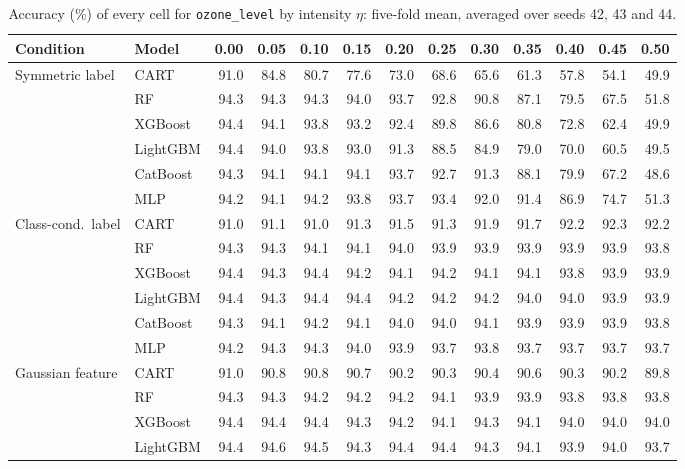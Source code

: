 \documentclass[pdflatex,sn-mathphys]{sn-jnl}
\theoremstyle{thmstyleone}
\begin{document}
\begin{table}[htbp]
\centering
\tiny
\setlength{\tabcolsep}{2.6pt}
\caption{Accuracy (\%) of every cell for \texttt{ozone\_level} by intensity $\eta$: five-fold mean, averaged over seeds 42, 43 and 44.}
\label{tab:grid_ozone_level}
\begin{tabular}{@{}llrrrrrrrrrrr@{}}
\toprule
Condition & Model & 0.00 & 0.05 & 0.10 & 0.15 & 0.20 & 0.25 & 0.30 & 0.35 & 0.40 & 0.45 & 0.50 \\
\midrule
Symmetric label & CART & 91.0 & 84.8 & 80.7 & 77.6 & 73.0 & 68.6 & 65.6 & 61.3 & 57.8 & 54.1 & 49.9 \\
 & RF & 94.3 & 94.3 & 94.3 & 94.0 & 93.7 & 92.8 & 90.8 & 87.1 & 79.5 & 67.5 & 51.8 \\
 & XGBoost & 94.4 & 94.1 & 93.8 & 93.2 & 92.4 & 89.8 & 86.6 & 80.8 & 72.8 & 62.4 & 49.9 \\
 & LightGBM & 94.4 & 94.0 & 93.8 & 93.0 & 91.3 & 88.5 & 84.9 & 79.0 & 70.0 & 60.5 & 49.5 \\
 & CatBoost & 94.3 & 94.1 & 94.1 & 94.1 & 93.7 & 92.7 & 91.3 & 88.1 & 79.9 & 67.2 & 48.6 \\
 & MLP & 94.2 & 94.1 & 94.2 & 93.8 & 93.7 & 93.4 & 92.0 & 91.4 & 86.9 & 74.7 & 51.3 \\
\midrule
Class-cond.\ label & CART & 91.0 & 91.1 & 91.0 & 91.3 & 91.5 & 91.3 & 91.9 & 91.7 & 92.2 & 92.3 & 92.2 \\
 & RF & 94.3 & 94.3 & 94.1 & 94.1 & 94.0 & 93.9 & 93.9 & 93.9 & 93.9 & 93.9 & 93.8 \\
 & XGBoost & 94.4 & 94.3 & 94.4 & 94.2 & 94.1 & 94.2 & 94.1 & 94.1 & 93.8 & 93.9 & 93.9 \\
 & LightGBM & 94.4 & 94.3 & 94.4 & 94.4 & 94.2 & 94.2 & 94.2 & 94.0 & 94.0 & 93.9 & 93.9 \\
 & CatBoost & 94.3 & 94.1 & 94.2 & 94.1 & 94.0 & 94.0 & 94.1 & 93.9 & 93.9 & 93.9 & 93.8 \\
 & MLP & 94.2 & 94.3 & 94.3 & 94.0 & 93.9 & 93.7 & 93.8 & 93.7 & 93.7 & 93.7 & 93.7 \\
\midrule
Gaussian feature & CART & 91.0 & 90.8 & 90.8 & 90.7 & 90.2 & 90.3 & 90.4 & 90.6 & 90.3 & 90.2 & 89.8 \\
 & RF & 94.3 & 94.3 & 94.2 & 94.2 & 94.2 & 94.1 & 93.9 & 93.9 & 93.8 & 93.8 & 93.8 \\
 & XGBoost & 94.4 & 94.4 & 94.4 & 94.3 & 94.2 & 94.1 & 94.3 & 94.1 & 94.0 & 94.0 & 94.0 \\
 & LightGBM & 94.4 & 94.6 & 94.5 & 94.3 & 94.4 & 94.4 & 94.3 & 94.1 & 93.9 & 94.0 & 93.7 \\

\end{tabular}
\end{table}
\end{document}
